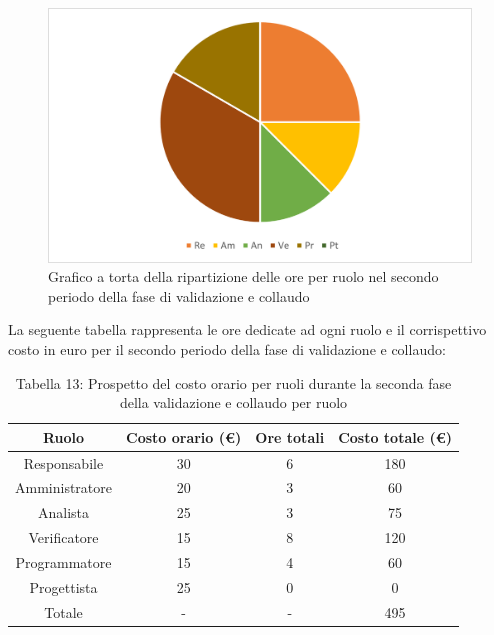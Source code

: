\begin{figure}[H]
    \centering
    \includegraphics[scale=0.6]{img/grafi preventivo/torta/validazione/periodo2.png}
    \caption{Grafico a torta della ripartizione delle ore per ruolo nel secondo periodo della fase di validazione e collaudo}
\end{figure}
La seguente tabella rappresenta le ore dedicate ad ogni ruolo e il corrispettivo costo in euro per il secondo periodo della fase di validazione e collaudo:
\begin{table}[h]
	\setlength\extrarowheight{5pt}
	\centering
	\begin{tabularx}{\textwidth}{|ccc|c|}
		\hline
		\rowcolor{white}
		\textbf{Ruolo} & \textbf{Costo orario (€)} & \textbf{Ore totali} & \textbf{Costo totale (€)} \\
		\hline
		Responsabile &30&6&180 \\
		Amministratore &20&3&60 \\
		Analista &25&3&75 \\
		Verificatore &15&8&120 \\
		Programmatore &15&4&60 \\
		Progettista &25&0&0 \\
		\hline
		Totale &-&-&495 \\
		\hline
	\end{tabularx}
    \vspace{10pt}
	\caption{Tabella 13: Prospetto del costo orario per ruoli durante la seconda fase della validazione e collaudo per ruolo}
\end{table}
